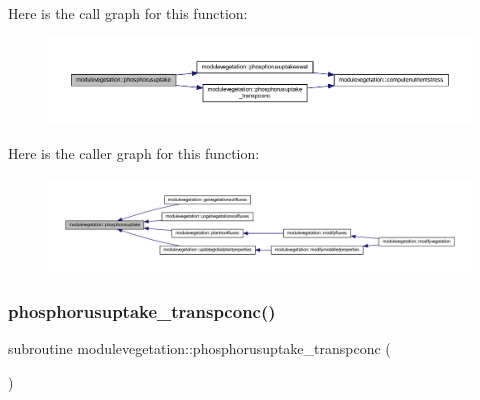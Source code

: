 Here is the call graph for this function\+:\nopagebreak
\begin{figure}[H]
\begin{center}
\leavevmode
\includegraphics[width=350pt]{namespacemodulevegetation_a8ecdc6f2c513a0f8920f448525858005_cgraph}
\end{center}
\end{figure}
Here is the caller graph for this function\+:\nopagebreak
\begin{figure}[H]
\begin{center}
\leavevmode
\includegraphics[width=350pt]{namespacemodulevegetation_a8ecdc6f2c513a0f8920f448525858005_icgraph}
\end{center}
\end{figure}
\mbox{\label{namespacemodulevegetation_a00089a428473ea96d0f567289aabe4f8}} 
\subsubsection{\texorpdfstring{phosphorusuptake\+\_\+transpconc()}{phosphorusuptake\_transpconc()}}
{\footnotesize\ttfamily subroutine modulevegetation\+::phosphorusuptake\+\_\+transpconc (\begin{DoxyParamCaption}{ }\end{DoxyParamCaption})\hspace{0.3cm}{\ttfamily [private]}}

